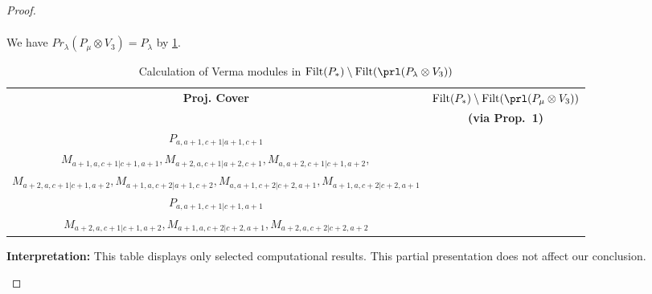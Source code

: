 \begin{proof}
\begin{enumerate}
\begin{enumerate}
\begin{equation}
\begin{aligned}
  \end{aligned}
\end{equation}
       We have $Pr_{\lambda}(P_\mu \otimes V_{3}) = P_\lambda  $ by \cref{tab:verma-analysis_5}. 
\begin{table}[htbp]
\centering
\caption{Calculation of Verma modules in $\operatorname{Filt}(P_*) \setminus \operatorname{Filt}(\prl(P_\lambda \otimes V_3)) $ } \label{tab:verma-analysis_5}
\begin{tabular}{cc}
\toprule
  \textbf{Proj. Cover} & \textbf{$\operatorname{Filt}(P_*) \setminus \operatorname{Filt}(\prl(P_\mu \otimes V_3)) $}  \\
     & \textbf{(via Prop.~1)}  \\
\midrule
  $P_{a,a+1,c+1|a+1,c+1}$ & \makecell{
$M_{a,a+2,c+1|a+2,c+1},
M_{a,a+1,c+2|a+1,c+2},
M_{a+1,a,c+1|a+1,c+1},$ \\
$M_{a+1,a,c+1|c+1,a+1},
M_{a+2,a,c+1|a+2,c+1},
M_{a,a+2,c+1|c+1,a+2},$ \\
$M_{a+2,a,c+1|c+1,a+2},
M_{a+1,a,c+2|a+1,c+2},
M_{a,a+1,c+2|c+2,a+1},
M_{a+1,a,c+2|c+2,a+1}$
  } \\
    $P_{a,a+1,c+1|c+1,a+1}$ & \makecell{
$M_{a,a+2,c+1|c+1,a+2},
M_{a,a+1,c+2|c+2,a+1},
M_{a,a+2,c+2|c+2,a+2},
M_{a+1,a,c+1|c+1,a+1},$ \\
$M_{a+2,a,c+1|c+1,a+2},
M_{a+1,a,c+2|c+2,a+1},
M_{a+2,a,c+2|c+2,a+2}$
    } \\
\bottomrule
\end{tabular}
\vspace{0.5em}
\parbox{\linewidth}{\small
\textbf{Interpretation:} 
This table displays only selected computational results. This partial presentation does not affect our conclusion.
}
\end{table}


\end{enumerate}
\end{enumerate}
\end{proof}
